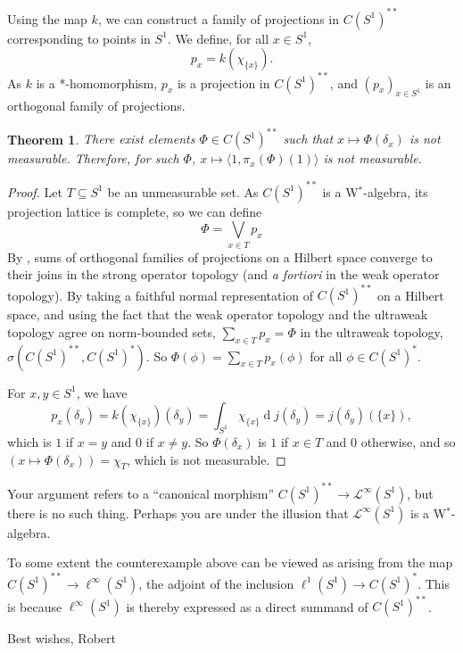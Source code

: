 \documentclass{article}
\newcommand{\Ell}{\mathcal{L}}
\renewcommand{\d}[1]{\operatorname{d}\!{#1}}
\newtheorem{theorem}{Theorem}[section]
\begin{document}
Using the map $k$, we can construct a family of projections in $C(S^1)^{**}$ corresponding to points in $S^1$. We define, for all $x \in S^1$,
\[
p_x = k(\chi_{\{x\}}).
\]
As $k$ is a *-homomorphism, $p_x$ is a projection in $C(S^1)^{**}$, and $(p_x)_{x \in S^1}$ is an orthogonal family of projections. 

\begin{theorem}
There exist elements $\Phi \in C(S^1)^{**}$ such that $x \mapsto \Phi(\delta_x)$ is not measurable. Therefore, for such $\Phi$, $x \mapsto \langle 1, \pi_x(\Phi)(1) \rangle$ is not measurable. 
\end{theorem}
\begin{proof}
Let $T \subseteq S^1$ be an unmeasurable set. As $C(S^1)^{**}$ is a W$^*$-algebra, its projection lattice is complete, so we can define 
\[
\Phi = \bigvee_{x \in T}p_x
\]
By \cite[\S 30 Theorem 1]{halmosHilb}, sums of orthogonal families of projections on a Hilbert space converge to their joins in the strong operator topology (and \emph{a fortiori} in the weak operator topology). By taking a faithful normal representation of $C(S^1)^{**}$ on a Hilbert space, and using the fact that the weak operator topology and the ultraweak topology agree on norm-bounded sets, $\sum_{x \in T}p_x = \Phi$ in the ultraweak topology, $\sigma(C(S^1)^{**},C(S^1)^*)$. So $\Phi(\phi) = \sum_{x \in T}p_x(\phi)$ for all $\phi \in C(S^1)^*$. 

For $x,y \in S^1$, we have 
\[
p_x(\delta_y) = k(\chi_{\{x\}})(\delta_y) = \int_{S^1}\chi_{\{x\}}\d{j(\delta_y)} = j(\delta_y)(\{x\}),
\]
which is $1$ if $x = y$ and $0$ if $x \neq y$. So $\Phi(\delta_x)$ is $1$ if $x \in T$ and $0$ otherwise, and so $(x \mapsto \Phi(\delta_x)) = \chi_T$, which is not measurable.
\end{proof}


Your argument refers to a ``canonical morphism'' $C(S^1)^{**} \rightarrow \Ell^\infty(S^1)$, but there is no such thing. Perhaps you are under the illusion that $\Ell^\infty(S^1)$ is a W$^*$-algebra. 

To some extent the counterexample above can be viewed as arising from the map $C(S^1)^{**} \rightarrow \ell^\infty(S^1)$, the adjoint of the inclusion $\ell^1(S^1) \rightarrow C(S^1)^*$. This is because $\ell^\infty(S^1)$ is thereby expressed as a direct summand of $C(S^1)^{**}$. 

Best wishes,
Robert



\end{document}
